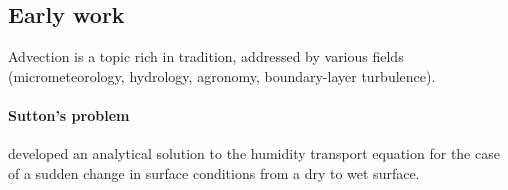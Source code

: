 \documentclass{article}
\begin{document}
    \subsection*{Early work} 

        Advection is a topic rich in tradition, addressed by various fields (micrometeorology, hydrology, agronomy, boundary-layer turbulence).

  \paragraph{Sutton's problem}
     
     
\citet{sutton1934wind} developed an analytical solution to the humidity transport equation for the case of a sudden change in surface conditions from a dry to wet surface.
    
\end{document}
